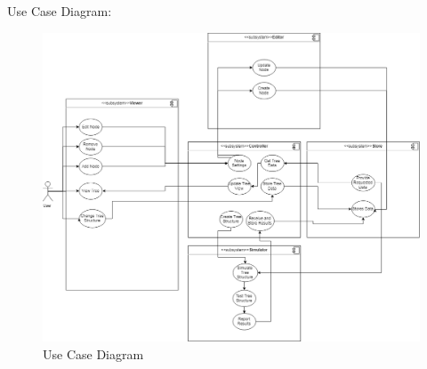 \documentclass[12pt]{article}
\begin{document}
    Use Case Diagram:
    
    \begin{figure}[H]
      \includegraphics[width=\linewidth]{images/TriiUseCaseDiagram}
      \caption{Use Case Diagram}
      \label{fig:usecasediagram}
    \end{figure}
  
\end{document}

